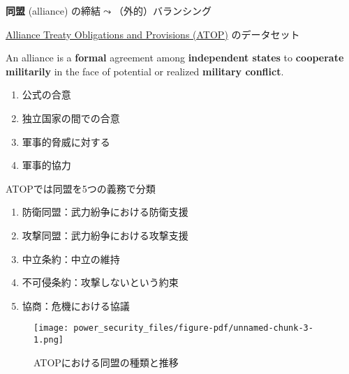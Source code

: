 \documentclass[
  xelatex,
  ja=standard]{bxjsarticle}
\providecommand{\tightlist}{%
  \setlength{\itemsep}{0pt}\setlength{\parskip}{0pt}}\usepackage{longtable,booktabs,array}
\begin{document}
\textbf{同盟} (alliance) の締結\(\leadsto\)（外的）バランシング

\href{http://www.atopdata.org/}{Alliance Treaty Obligations and
Provisions (ATOP)} のデータセット\citep{leeds2002}

\begin{tcolorbox}[enhanced jigsaw, opacityback=0, leftrule=.75mm, toptitle=1mm, colframe=quarto-callout-note-color-frame, arc=.35mm, bottomrule=.15mm, coltitle=black, bottomtitle=1mm, colbacktitle=quarto-callout-note-color!10!white, titlerule=0mm, breakable, title=\textcolor{quarto-callout-note-color}{\faInfo}\hspace{0.5em}{\href{http://www.atopdata.org/uploads/6/9/1/3/69134503/atop_5_1_codebook.pdf}{ATOPにおける同盟の定義}}, left=2mm, rightrule=.15mm, toprule=.15mm, opacitybacktitle=0.6, colback=white]

An alliance is a \textbf{formal} agreement among \textbf{independent
states} to \textbf{cooperate militarily} in the face of potential or
realized \textbf{military conflict}.

\end{tcolorbox}

\begin{enumerate}
\def\labelenumi{\arabic{enumi}.}
\tightlist
\item
  公式の合意
\item
  独立国家の間での合意
\item
  軍事的脅威に対する
\item
  軍事的協力
\end{enumerate}

ATOPでは同盟を5つの義務で分類

\begin{enumerate}
\def\labelenumi{\arabic{enumi}.}
\tightlist
\item
  防衛同盟：武力紛争における防衛支援
\item
  攻撃同盟：武力紛争における攻撃支援
\item
  中立条約：中立の維持
\item
  不可侵条約：攻撃しないという約束
\item
  協商：危機における協議
\end{enumerate}

\begin{figure}[htpb]

{\centering \texttt{[image: power\_security\_files/figure-pdf/unnamed-chunk-3-1.png]}

}

\caption{ATOPにおける同盟の種類と推移}

\end{figure}
\end{document}
